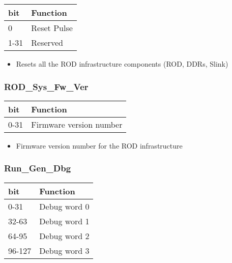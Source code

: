 \begin {table}[H]
\begin{center}
\begin{tabular}{|l|l|}
\hline
\textbf{bit} & \textbf{Function} \\
\hline
0 & Reset Pulse \\
\hline
1-31 & Reserved  \\
\hline
\end{tabular}
\end{center}
\end{table}


\begin{itemize}
\item Resets all the ROD infrastructure components (ROD, DDRs, Slink)
\end{itemize}



\subsubsection{ROD\_Sys\_Fw\_Ver}

\begin {table}[H]
\begin{center}
\begin{tabular}{|l|l|}
\hline
\textbf{bit} & \textbf{Function} \\
\hline
0-31 & Firmware version number \\
\hline
\end{tabular}
\end{center}
\end{table}


\begin{itemize}
\item Firmware version number for the ROD infrastructure
\end{itemize}




\subsubsection{Run\_Gen\_Dbg}

\begin {table}[H]
\begin{center}
\begin{tabular}{|l|l|}
\hline
\textbf{bit} & \textbf{Function} \\
\hline
0-31 & Debug word 0 \\
\hline
32-63 & Debug word 1 \\
\hline
64-95 & Debug word 2 \\
\hline
96-127 & Debug word 3 \\
\hline
\end{tabular}
\end{center}
\end{table}

